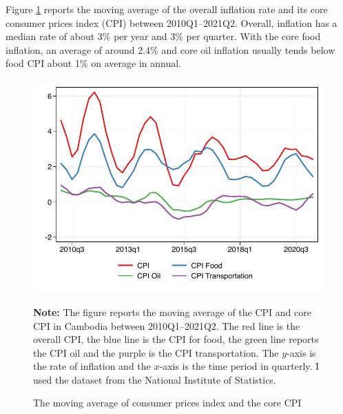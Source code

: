 \documentclass[11pt,letterpaper]{article}
\begin{document}
Figure \ref{fig:3} reports the moving average of the overall inflation rate and its core consumer prices index (CPI) between 2010Q1--2021Q2. Overall, inflation has a median rate of about 3\% per year and 3\% per quarter. With the core food inflation, an average of around 2.4\% and core oil inflation usually tends below food CPI about 1\% on average in annual. 
\begin{figure}[H]
	\centering
	\caption{The moving average of consumer prices index and the core CPI}
	\label{fig:3}
	\includegraphics[width=.8\linewidth]{../../empirical/Marcodata/Graphs/moving_cpi} \vspace{-1em}
	
	\begin{tablenotes}
		\footnotesize
		\item \textbf{Note:} The figure reports the moving average of the CPI and core CPI in Cambodia between 2010Q1--2021Q2. The red line is the overall CPI, the blue line is the CPI for food, the green line reports the CPI oil and the purple is the CPI transportation. The $y$-axis is the rate of inflation and the $x$-axis is the time period in quarterly. I used the dataset from the National Institute of Statistics. 
	\end{tablenotes} 
	
\end{figure}
\end{document}
